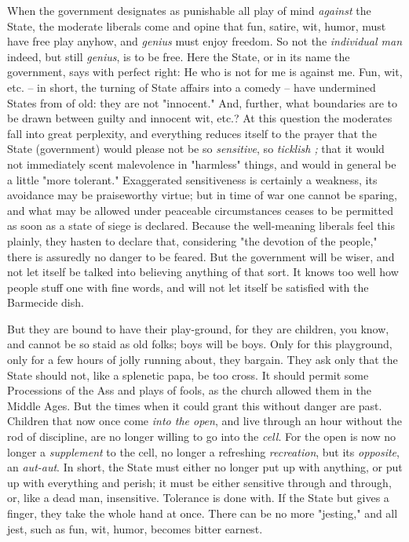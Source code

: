 When the government designates as punishable all play of mind \textit{against} 
the State, the moderate liberals come and opine that fun, satire, wit, humor, 
must have free play anyhow, and \textit{genius} must enjoy freedom. So not the 
\textit{individual man} indeed, but still \textit{genius}, is to be free. Here 
the State, or in its name the government, says with perfect right: He who is 
not for me is against me. Fun, wit, etc. -- in short, the turning of State 
affairs into a comedy -- have undermined States from of old: they are not 
"{}innocent."{} And, further, what boundaries are to be drawn between guilty 
and innocent wit, etc.? At this question the moderates fall into great 
perplexity, and everything reduces itself to the prayer that the State 
(government) would please not be so \textit{sensitive}, so \textit{ticklish ;} 
that it would not immediately scent malevolence in "{}harmless"{} things, and 
would in general be a little "{}more tolerant."{} Exaggerated sensitiveness is 
certainly a weakness, its avoidance may be praiseworthy virtue; but in time of 
war one cannot be sparing, and what may be allowed under peaceable 
circumstances ceases to be permitted as soon as a state of siege is declared. 
Because the well-meaning liberals feel this plainly, they hasten to declare 
that, considering "{}the devotion of the people,"{} there is assuredly no 
danger to be feared. But the government will be wiser, and not let itself be 
talked into believing anything of that sort. It knows too well how people 
stuff one with fine words, and will not let itself be satisfied with the 
Barmecide dish.

But they are bound to have their play-ground, for they are children, you know, 
and cannot be so staid as old folks; boys will be boys. Only for this 
playground, only for a few hours of jolly running about, they bargain. They 
ask only that the State should not, like a splenetic papa, be too cross. It 
should permit some Processions of the Ass and plays of fools, as the church 
allowed them in the Middle Ages. But the times when it could grant this 
without danger are past. Children that now once come \textit{into the open}, 
and live through an hour without the rod of discipline, are no longer willing 
to go into the \textit{cell}. For the open is now no longer a 
\textit{supplement} to the cell, no longer a refreshing \textit{recreation}, 
but its \textit{opposite}, an \textit{aut-aut}. In short, the State must 
either no longer put up with anything, or put up with everything and perish; 
it must be either sensitive through and through, or, like a dead man, 
insensitive. Tolerance is done with. If the State but gives a finger, they 
take the whole hand at once. There can be no more "{}jesting,"{} and all jest, 
such as fun, wit, humor, becomes bitter earnest.

